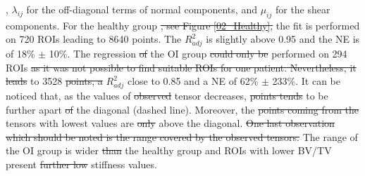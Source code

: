 \documentclass[a4paper,fleqn]{DC_ArtStyle}
\providecommand{\DIFadd}[1]{{\protect\color{blue}{#1}}} %
\providecommand{\DIFdel}[1]{{\protect\color{red}\sout{#1}}}                      %
\providecommand{\DIFaddbegin}{} %
\providecommand{\DIFaddend}{} %
\providecommand{\DIFdelbegin}{} %
\providecommand{\DIFdelend}{} %
\begin{document}
{, $\lambda_{ij}$ for the off-diagonal terms of normal components, and $\mu_{ij}$ for the shear components}\DIFdelend \DIFaddbegin \DIFadd{, indicating the theoretical perfect correlation}\DIFaddend . For the healthy group \DIFdelbegin \DIFdel{, see Figure \ref{02_Healthy}, }\DIFdelend \DIFaddbegin \DIFadd{(Figure \ref{02_Healthy}) }\DIFaddend the fit is performed on 720 ROIs leading to 8640 \DIFaddbegin \DIFadd{data }\DIFaddend points. The $R^2_{adj}$ is slightly above 0.95 and the NE is of 18\% $\pm$ 10\%. The regression \DIFdelbegin \DIFdel{of }\DIFdelend \DIFaddbegin \DIFadd{analysis for }\DIFaddend the OI group \DIFdelbegin \DIFdel{could only be }\DIFdelend \DIFaddbegin \DIFadd{(Figure \ref{02_OI}) }\DIFaddend performed on 294 ROIs \DIFdelbegin \DIFdel{as it was not possible to find suitable ROIs for one patient. Nevertheless, it leads }\DIFdelend \DIFaddbegin \DIFadd{led }\DIFaddend to 3528 \DIFdelbegin \DIFdel{points, a }\DIFdelend \DIFaddbegin \DIFadd{data points, an }\DIFaddend $R^2_{adj}$ close to 0.85 and a NE of 62\% $\pm$ 233\%. It can be noticed that, as the values of \DIFdelbegin \DIFdel{observed }\DIFdelend \DIFaddbegin \DIFadd{the observed stiffness }\DIFaddend tensor decreases, \DIFdelbegin \DIFdel{points tends }\DIFdelend \DIFaddbegin \DIFadd{data points tend }\DIFaddend to be further apart \DIFdelbegin \DIFdel{of }\DIFdelend \DIFaddbegin \DIFadd{from }\DIFaddend the diagonal (dashed line). Moreover, \DIFaddbegin \DIFadd{data the points from }\DIFaddend the \DIFdelbegin \DIFdel{points coming from the }\DIFdelend \DIFaddbegin \DIFadd{stiffness }\DIFaddend tensors with lowest values are \DIFdelbegin \DIFdel{only }\DIFdelend \DIFaddbegin \DIFadd{exclusively }\DIFaddend above the diagonal. \DIFdelbegin \DIFdel{One last observation which should be noted is the range covered by the observed tensors. }\DIFdelend The range of \DIFaddbegin \DIFadd{stiffness tensors of }\DIFaddend the OI group is wider \DIFdelbegin \DIFdel{than }\DIFdelend \DIFaddbegin \DIFadd{compared to the one of }\DIFaddend the healthy group and ROIs with lower BV/TV present \DIFdelbegin \DIFdel{further low }\DIFdelend \DIFaddbegin \DIFadd{lower }\DIFaddend stiffness values. \DIFaddbegin \DIFadd{The values of these ROIs stiffness tensors components tends to be overestimated by the fit.}\DIFaddend \\
\end{document}
